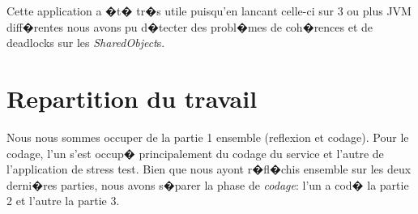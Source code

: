 \documentclass[]{report}   %
\begin{document}
Cette application a �t� tr�s utile puisqu'en lancant celle-ci sur 3 ou plus
JVM diff�rentes nous avons pu d�tecter des probl�mes de coh�rences et de deadlocks sur les \textit{SharedObject}s. 

\section{Repartition du travail}
Nous nous sommes occuper de la partie 1 ensemble (reflexion et
codage). Pour le codage, l'un s'est occup� principalement du codage du service
et l'autre de l'application de stress test.
Bien que nous ayont r�fl�chis ensemble sur les deux derni�res parties, nous
avons s�parer la phase de \textit{codage}: l'un a cod� la partie 2 et l'autre la partie 3.
\end{document}
